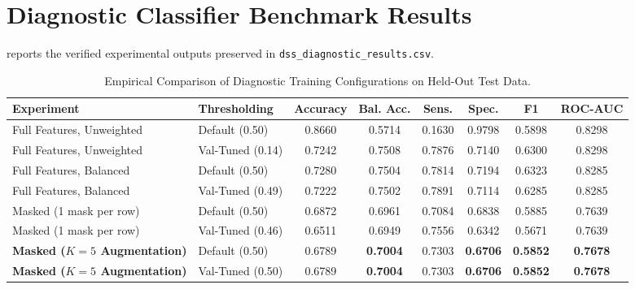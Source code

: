 \documentclass[11pt,a4paper]{report}
\begin{document}
\section{Diagnostic Classifier Benchmark Results}
 reports the verified experimental outputs preserved in \texttt{dss\_diagnostic\_results.csv}.

\begin{table}[htbp]
  \centering
  \small
  \caption{Empirical Comparison of Diagnostic Training Configurations on Held-Out Test Data.}
  \label{tab:diagnostic_results}
  \begin{tabularx}{\textwidth}{llcccccc}
    \toprule
    \textbf{Experiment} & \textbf{Thresholding} & \textbf{Accuracy} & \textbf{Bal. Acc.} & \textbf{Sens.} & \textbf{Spec.} & \textbf{F1} & \textbf{ROC-AUC} \\
    \midrule
    Full Features, Unweighted & Default (0.50) & 0.8660 & 0.5714 & 0.1630 & 0.9798 & 0.5898 & 0.8298 \\
    Full Features, Unweighted & Val-Tuned (0.14) & 0.7242 & 0.7508 & 0.7876 & 0.7140 & 0.6300 & 0.8298 \\
    \midrule
    Full Features, Balanced & Default (0.50) & 0.7280 & 0.7504 & 0.7814 & 0.7194 & 0.6323 & 0.8285 \\
    Full Features, Balanced & Val-Tuned (0.49) & 0.7222 & 0.7502 & 0.7891 & 0.7114 & 0.6285 & 0.8285 \\
    \midrule
    Masked (1 mask per row) & Default (0.50) & 0.6872 & 0.6961 & 0.7084 & 0.6838 & 0.5885 & 0.7639 \\
    Masked (1 mask per row) & Val-Tuned (0.46) & 0.6511 & 0.6949 & 0.7556 & 0.6342 & 0.5671 & 0.7639 \\
    \midrule
    \textbf{Masked ($K=5$ Augmentation)} & Default (0.50) & 0.6789 & \textbf{0.7004} & 0.7303 & \textbf{0.6706} & \textbf{0.5852} & \textbf{0.7678} \\
    \textbf{Masked ($K=5$ Augmentation)} & Val-Tuned (0.50) & 0.6789 & \textbf{0.7004} & 0.7303 & \textbf{0.6706} & \textbf{0.5852} & \textbf{0.7678} \\
    \bottomrule
  \end{tabularx}
\end{table}
\end{document}
